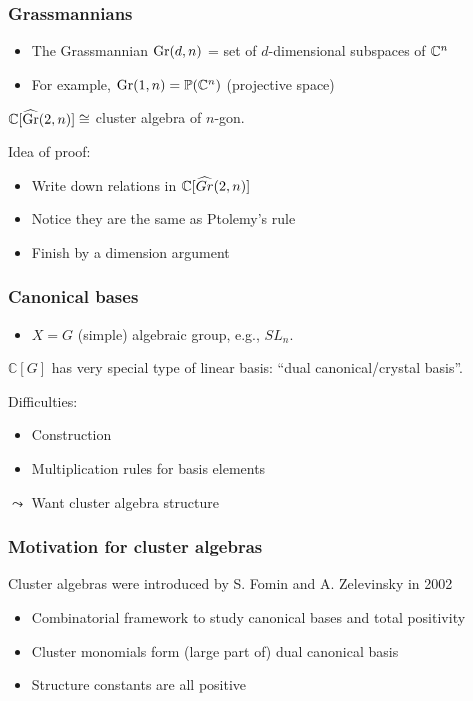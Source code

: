 \documentclass[aspectratio=169]{beamer}
\begin{document}
\begin{frame}
	\frametitle{Grassmannians}
	\begin{itemize}
		\item The Grassmannian $\operatorname{Gr}(d,n)$ = set of $d$-dimensional subspaces of $\mathbb{C}^n$
		\item For example, $\operatorname{Gr}(1, n) = \mathbb{P}(\mathbb{C}^n)$ (projective space)
	\end{itemize}
	\pause
	\begin{theorem}
		$\mathbb{C}[\widehat{\operatorname{Gr}}(2,n)] \cong $ cluster algebra of $n$-gon.
	\end{theorem}
	\pause
	Idea of proof:
	\begin{itemize}
		\item Write down relations in $\mathbb{C}[\widehat{Gr}(2,n)]$
		\item Notice they are the same as Ptolemy's rule
		\item Finish by a dimension argument
	\end{itemize}

\end{frame}

\begin{frame}
	\frametitle{Canonical bases}

	\begin{itemize}
		\item $X = G$ (simple) algebraic group, e.g., $SL_n$.
	\end{itemize}
	\pause
	\begin{theorem}
		$\mathbb{C}[G]$ has very special type of linear basis: ``dual canonical/crystal basis''.
	\end{theorem}
	\pause
	Difficulties:
	\begin{itemize}
		\item Construction
		\item Multiplication rules for basis elements
	\end{itemize}
	\pause
	$\leadsto$ Want cluster algebra structure

\end{frame}

\begin{frame}
	\frametitle{Motivation for cluster algebras}

	Cluster algebras were introduced by S. Fomin and A. Zelevinsky in 2002
	\begin{itemize}
		\item Combinatorial framework to study canonical bases and total positivity
		\item Cluster monomials form (large part of) dual canonical basis
		\item Structure constants are all positive
	\end{itemize}
\end{frame}
\end{document}
